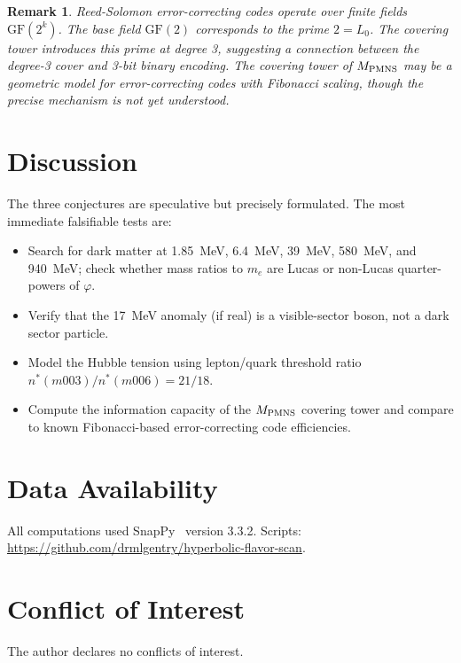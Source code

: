 \documentclass[12pt]{article}
\newtheorem{remark}[conjecture]{Remark}
\newcommand{\ph}{\varphi}
\begin{document}
\begin{remark}
Reed-Solomon error-correcting codes operate over finite fields
$\mathrm{GF}(2^k)$. The base field $\mathrm{GF}(2)$ corresponds
to the prime $2 = L_0$. The covering tower introduces this prime
at degree 3, suggesting a connection between the degree-3 cover
and 3-bit binary encoding. The covering tower of $M_{\rm PMNS}$
may be a geometric model for error-correcting codes with Fibonacci
scaling, though the precise mechanism is not yet understood.
\end{remark}

\section{Discussion}

The three conjectures are speculative but precisely formulated.
The most immediate falsifiable tests are:
\begin{itemize}
  \item Search for dark matter at 1.85~MeV, 6.4~MeV, 39~MeV,
        580~MeV, and 940~MeV; check whether mass ratios to $m_e$
        are Lucas or non-Lucas quarter-powers of $\ph$.
  \item Verify that the 17~MeV anomaly (if real) is a visible-sector
        boson, not a dark sector particle.
  \item Model the Hubble tension using lepton/quark threshold ratio
        $n^*(m003)/n^*(m006) = 21/18$.
  \item Compute the information capacity of the $M_{\rm PMNS}$
        covering tower and compare to known Fibonacci-based
        error-correcting code efficiencies.
\end{itemize}

\section*{Data Availability}
All computations used SnapPy~\cite{SnapPy} version 3.3.2.
Scripts: \url{https://github.com/drmlgentry/hyperbolic-flavor-scan}.

\section*{Conflict of Interest}
The author declares no conflicts of interest.
\end{document}
